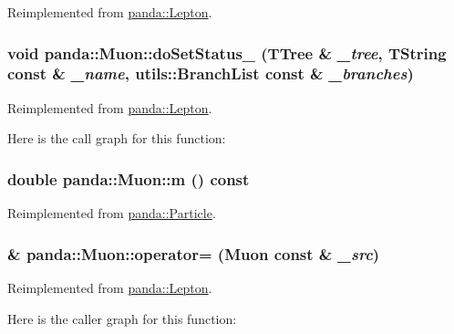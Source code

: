 Reimplemented from \hyperlink{classpanda_1_1Lepton_a2d46b07ce93bec008954f222c6860ff9}{panda::Lepton}.\hypertarget{classpanda_1_1Muon_a5a1c65b72491bc9df325bc182568e40c}{
\subsubsection[{doSetStatus\_\-}]{\setlength{\rightskip}{0pt plus 5cm}void panda::Muon::doSetStatus\_\- (TTree \& {\em \_\-tree}, \/  TString const \& {\em \_\-name}, \/  {\bf utils::BranchList} const \& {\em \_\-branches})}}
\label{classpanda_1_1Muon_a5a1c65b72491bc9df325bc182568e40c}


Reimplemented from \hyperlink{classpanda_1_1Lepton_a2d3b49322244947c933645bbdb44bf88}{panda::Lepton}.

Here is the call graph for this function:\hypertarget{classpanda_1_1Muon_ac5fc1640178d5b0d00dd3eefa6fd44fb}{
\subsubsection[{m}]{\setlength{\rightskip}{0pt plus 5cm}double panda::Muon::m () const}}
\label{classpanda_1_1Muon_ac5fc1640178d5b0d00dd3eefa6fd44fb}


Reimplemented from \hyperlink{classpanda_1_1Particle_aa793c05fc1334ed462e18c794339eebf}{panda::Particle}.\hypertarget{classpanda_1_1Muon_a2f91424e93572f9efd189884d95efaf6}{
\subsubsection[{operator=}]{ \& panda::Muon::operator= ({\bf Muon} const \& {\em \_\-src})}}
\label{classpanda_1_1Muon_a2f91424e93572f9efd189884d95efaf6}


Reimplemented from \hyperlink{classpanda_1_1Lepton_a24b1cd552930db2af2734d3acbb27257}{panda::Lepton}.

Here is the caller graph for this function:

